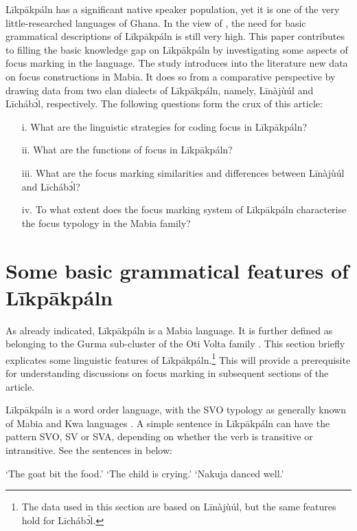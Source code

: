 \documentclass[output=paper,colorlinks,citecolor=brown]{langscibook}
\begin{document}
Līkpākpáln has a significant native speaker population, yet it is one of the very little-researched languages of Ghana. In the view of \citet{Schwarz2009}, the need for basic grammatical descriptions of Līkpākpáln is still very high. This paper contributes to filling the basic knowledge gap on Līkpākpáln by investigating some aspects of focus marking in the language. The study introduces into the literature new data on focus constructions in Mabia. It does so from a comparative perspective by drawing data from two clan dialects of Līkpākpáln, namely, Līnàjùúl and Līcháb\'{ɔ}l, respectively. The following questions form the crux of this article:

\begin{itemize}
    \item[i.]      What are the linguistic strategies for coding focus in Līkpākpáln?
    \item[ii.]     What are the functions of focus in Līkpākpáln?
    \item[iii.]    What are the focus marking similarities and differences between Līnàjùúl and Līcháb\'{ɔ}l?
    \item[iv.]     To what extent does the focus marking system of Līkpākpáln characterise the focus typology in the Mabia family?
\end{itemize}

\section{Some basic grammatical features of Līkpākpáln}\label{sec:bisilki:2}

As already indicated, Līkpākpáln is a Mabia language. It is further defined as belonging to the Gurma sub-cluster of the Oti Volta family \citep{Naden1988, SteeleWeed1966}. This section briefly explicates some linguistic features of Līkpākpáln.\footnote{The data used in this section are based on Līnàjùúl, but the same features hold for Līcháb\'{ɔ}l.} This will provide a prerequisite for understanding discussions on focus marking in subsequent sections of the article.

Līkpākpáln is a word order language, with the SVO typology as generally known of Mabia and Kwa languages \citep{Schwarz2009}. A simple sentence in Līkpākpáln can have the pattern SVO, SV or SVA, depending on whether the verb is transitive or intransitive. See the sentences in  below:

\ea%
    \label{ex:bisilki:1}
    \jambox*{[SVO]}
    \glt    ‘The goat bit the food.’
    \jambox*{[SV]}
	\glt    ‘The child is crying.’
    \jambox*{[SVA]}
    \glt    ‘Nakuja danced well.’
    \z
\z
\end{document}
